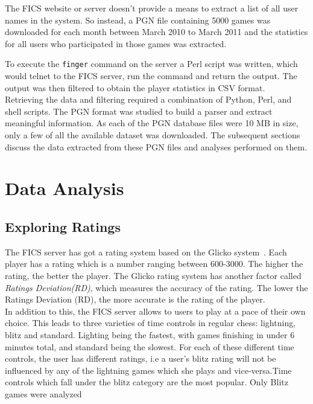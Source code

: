 \documentclass{article}
\begin{document}
\pagebreak

The FICS website or server doesn't provide a means to extract a list of all user names in the system. So instead, a PGN file containing 5000 games was downloaded for each month between March 2010 to March 2011 and the statistics for all users who participated in those games was extracted. 

To execute the \verb=finger= command on the server a Perl script was written, which would telnet to the FICS server, run the command and return the output. The output was then filtered to obtain the player statistics in CSV format. \\

Retrieving the data and filtering required a combination of Python, Perl, and shell scripts. The PGN format was studied to build a parser and extract meaningful information. As each of the PGN database files were 10 MB in size, only a few of all the available dataset was downloaded. The subsequent sections discuss the data extracted from these PGN files and analyses performed on them.


\section{Data Analysis}
\label{sec:analysis}
\subsection{Exploring Ratings}
The FICS server has got a rating system based on the Glicko system~\cite{spec:glicko}. Each player has a rating which is a number ranging between 600-3000. The higher the rating, the better the player. The Glicko rating system has another factor called \textsl{Ratings Deviation(RD)}, which measures the accuracy of the rating. The lower the Ratings Deviation (RD), the more accurate is the rating of the player.\\

In addition to this, the FICS server allows to users to play at a pace of their own choice. This leads to three varieties of time controls in regular chess: lightning, blitz and standard. Lighting being the fastest, with games finishing in under 6 minutes total, and standard being the slowest. For each of these different time controls, the user has different ratings, i.e a user's blitz rating will not be influenced by any of the lightning games which she plays and vice-versa.Time controls which fall under the blitz category are the most popular. Only Blitz games were analyzed\\
\end{document}
